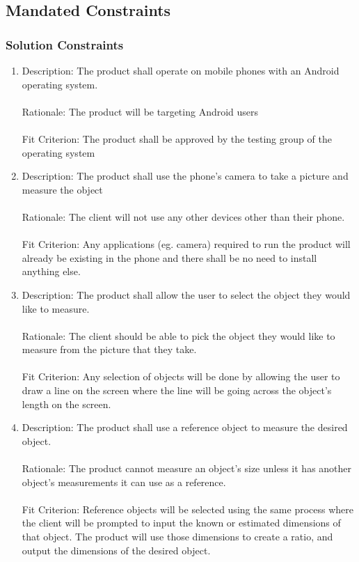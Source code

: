 \documentclass[12pt, titlepage]{article}
\begin{document}
\subsection{Mandated Constraints}
\subsubsection{Solution Constraints}
\begin{enumerate}
\item Description: The product shall operate on mobile phones with an Android operating system.\\ \\
Rationale: The product will be targeting Android users\\ \\
Fit Criterion: The product shall be approved by the testing group of the operating system

\item Description: The product shall use the phone’s camera to take a picture and measure the object\\ \\
Rationale: The client will not use any other devices other than their phone.\\ \\
Fit Criterion: Any applications (eg. camera) required to run the product will already be existing in the phone and there shall be no need to install anything else.

\item Description: The product shall allow the user to select the object they would like to measure.\\ \\
Rationale: The client should be able to pick the object they would like to measure from the picture that they take.\\ \\ 
Fit Criterion: Any selection of objects will be done by allowing the user to draw a line on the screen where the line will be going across the object’s length on the screen.

\item Description: The product shall use a reference object to measure the desired object.\\ \\
Rationale: The product cannot measure an object’s size unless it has another object’s measurements it can use as a reference.\\ \\
Fit Criterion: Reference objects will be selected using the same process where the client will be prompted to input the known or estimated dimensions of that object. The product will use those dimensions to create a ratio, and output the dimensions of the desired object.
\end{enumerate}
\end{document}
